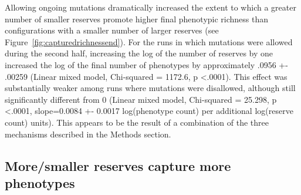 \documentclass[letterpaper]{article}
\begin{document}
Allowing ongoing mutations dramatically increased the extent to which a greater number of smaller reserves promote higher final phenotypic richness than configurations with a smaller number of larger reserves (see Figure~\ref{fig:capturedrichnessend}).  For the runs in which mutations were allowed during the second half, increasing the log of the number of reserves by one increased the log of the final number of phenotypes by approximately .0956 +- .00259 (Linear mixed model, Chi-squared = 1172.6, p \textless .0001). This effect was substantially weaker among runs where mutations were disallowed, although still significantly different from 0 (Linear mixed model, Chi-squared = 25.298, p \textless .0001, slope=0.0084 +- 0.0017 log(phenotype count) per additional log(reserve count) units). This appears to be the result of a combination of the three mechanisms described in the Methods section.
%
%
%
%
%
%
%
%


\subsection{More/smaller reserves capture more phenotypes}
\end{document}
